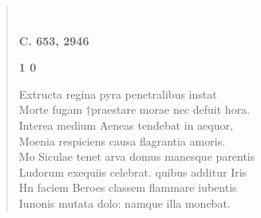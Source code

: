 \documentclass[11pt, a4paper]{report}
\begin{document}
\begin{verse}
        ﻿\pagebreak 
    \begin{center} \textbf{C. 653, 2946} \end{center}\begin{center} \textbf{1 0} \end{center}Extructa regina pyra penetralibus instat \\ Morte fugam †praestare morae nec defuit hora. \\ Interea medium Aeneas \rbrack  tendebat in aequor, \\ Moenia respiciens causa flagrantia amoris. \\ Mo Siculae tenet arva domus manesque parentis \\ Ludorum exequiis celebrat. quibus additur Iris \\ Hn faciem Beroes classem flammare iubentis \\ Iunonis mutata dolo: namque illa monebat. \\ 
      \end{verse}
  
\end{document}
